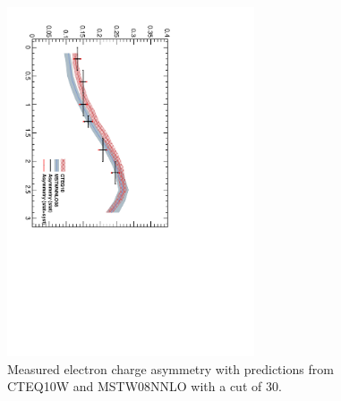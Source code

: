 \begin{figure}[htbp]
  \begin{center}
  \includegraphics*[width=0.65\textwidth,angle=90]{Asym_30}
  \caption[Measured electron charge asymmetry with a \pT cut of \unit{30}{\GeV}.]
{\label{fig:asym30} Measured electron charge asymmetry with predictions from
CTEQ10W and MSTW08NNLO with a \pT cut of \unit{30}{\GeV}\cite{baisini2010electron}.}
  \end{center}
\end{figure}

